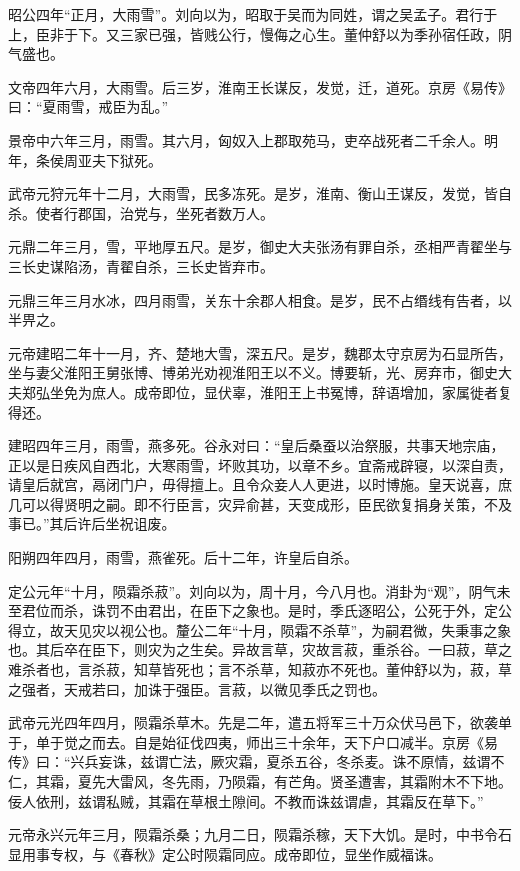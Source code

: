 \documentclass[]{article}
\begin{document}
昭公四年``正月，大雨雪''。刘向以为，昭取于吴而为同姓，谓之吴孟子。君行于上，臣非于下。又三家已强，皆贱公行，慢侮之心生。董仲舒以为季孙宿任政，阴气盛也。

文帝四年六月，大雨雪。后三岁，淮南王长谋反，发觉，迁，道死。京房《易传》曰：``夏雨雪，戒臣为乱。''

景帝中六年三月，雨雪。其六月，匈奴入上郡取苑马，吏卒战死者二千余人。明年，条侯周亚夫下狱死。

武帝元狩元年十二月，大雨雪，民多冻死。是岁，淮南、衡山王谋反，发觉，皆自杀。使者行郡国，治党与，坐死者数万人。

元鼎二年三月，雪，平地厚五尺。是岁，御史大夫张汤有罪自杀，丞相严青翟坐与三长史谋陷汤，青翟自杀，三长史皆弃市。

元鼎三年三月水冰，四月雨雪，关东十余郡人相食。是岁，民不占缗线有告者，以半畀之。

元帝建昭二年十一月，齐、楚地大雪，深五尺。是岁，魏郡太守京房为石显所告，坐与妻父淮阳王舅张博、博弟光劝视淮阳王以不义。博要斩，光、房弃市，御史大夫郑弘坐免为庶人。成帝即位，显伏辜，淮阳王上书冤博，辞语增加，家属徙者复得还。

建昭四年三月，雨雪，燕多死。谷永对曰：``皇后桑蚕以治祭服，共事天地宗庙，正以是日疾风自西北，大寒雨雪，坏败其功，以章不乡。宜斋戒辟寝，以深自责，请皇后就宫，鬲闭门户，毋得擅上。且令众妾人人更进，以时博施。皇天说喜，庶几可以得贤明之嗣。即不行臣言，灾异俞甚，天变成形，臣民欲复捐身关策，不及事已。''其后许后坐祝诅废。

阳朔四年四月，雨雪，燕雀死。后十二年，许皇后自杀。

定公元年``十月，陨霜杀菽''。刘向以为，周十月，今八月也。消卦为``观''，阴气未至君位而杀，诛罚不由君出，在臣下之象也。是时，季氏逐昭公，公死于外，定公得立，故天见灾以视公也。釐公二年``十月，陨霜不杀草''，为嗣君微，失秉事之象也。其后卒在臣下，则灾为之生矣。异故言草，灾故言菽，重杀谷。一曰菽，草之难杀者也，言杀菽，知草皆死也；言不杀草，知菽亦不死也。董仲舒以为，菽，草之强者，天戒若曰，加诛于强臣。言菽，以微见季氏之罚也。

武帝元光四年四月，陨霜杀草木。先是二年，遣五将军三十万众伏马邑下，欲袭单于，单于觉之而去。自是始征伐四夷，师出三十余年，天下户口减半。京房《易传》曰：``兴兵妄诛，兹谓亡法，厥灾霜，夏杀五谷，冬杀麦。诛不原情，兹谓不仁，其霜，夏先大雷风，冬先雨，乃陨霜，有芒角。贤圣遭害，其霜附木不下地。佞人依刑，兹谓私贼，其霜在草根土隙间。不教而诛兹谓虐，其霜反在草下。''

元帝永兴元年三月，陨霜杀桑；九月二日，陨霜杀稼，天下大饥。是时，中书令石显用事专权，与《春秋》定公时陨霜同应。成帝即位，显坐作威福诛。
\end{document}

